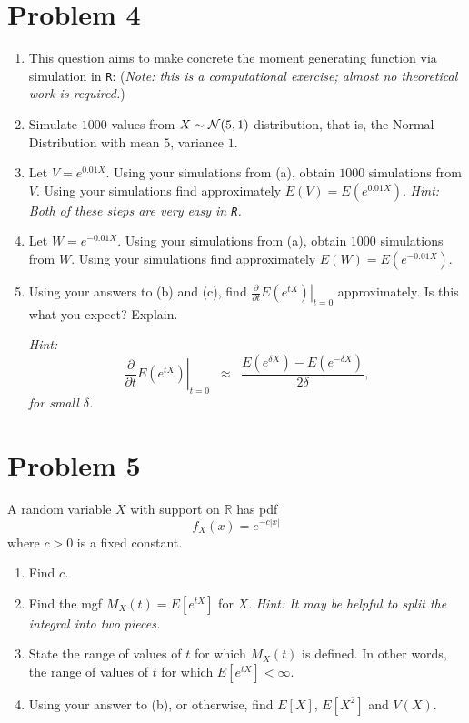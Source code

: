 \documentclass{article}
\newcommand{\1}{\mathbf{1}}
\begin{document}
	
\newpage
\section*{Problem 4}
\begin{enumerate}
    \item This question aims to make concrete the moment generating function via simulation in {\tt R}: ({\it Note: this is a computational exercise; almost no theoretical work is required.})
    \item Simulate $1000$ values from $X \sim {\cal N}(5,1)$ distribution, that is, the Normal Distribution with mean $5$, variance $1$.
    \item Let $V = e^{0.01 X}$. Using your simulations from (a), obtain $1000$ simulations from $V$. Using your simulations find approximately $E(V) = E(e^{0.01 X})$. {\it Hint: Both of these steps are very easy in {\tt R}.}
    \item Let $W = e^{-0.01 X}$. Using your simulations from (a), obtain $1000$ simulations from $W$. Using your simulations find approximately $E(W) = E(e^{-0.01 X})$.
    \item Using your answers to (b) and (c), find $ \left. \frac{\partial}{\partial t} E(e^{tX}) \right|_{t=0}$ approximately. Is this what you expect? Explain.\par
        {\it Hint: 
        $$ \left. \frac{\partial}{\partial t} E(e^{tX}) \right|_{t=0}\;\; \approx\;\; \frac{ E(e^{\delta X}) - E(e^{-\delta X})}{2\delta},$$
        for small $\delta$.}
\end{enumerate}

\newpage
\section*{Problem 5}
A random variable $X$ with support on $\mathbb{R}$ has pdf 
$$ f_X(x) = e^{-c|x|}$$
where $c >0$ is a fixed constant.
\begin{enumerate}
    \item Find $c$.
    \item Find the mgf $M_X(t) = E[e^{tX}]$ for $X$. {\it Hint: It may be helpful to split the integral into two pieces.}
    \item  State the range of values of $t$ for which $M_X(t)$ is defined. In other words, the range of values of $t$ for which $E[e^{tX}] < \infty$.\par
    \item Using your answer to (b), or otherwise, find $E[X]$, $E[X^2]$ and $V(X)$.
\end{enumerate}
\end{document}
